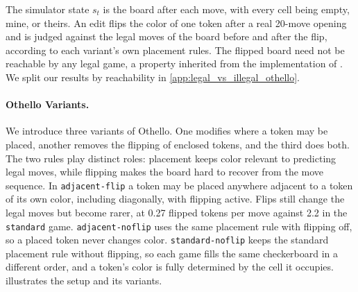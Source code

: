 \documentclass{article} %
\begin{document}
The simulator state $s_t$ is the board after each move, with every cell being empty, mine, or theirs. An edit flips the color of one token after a real 20-move opening and is judged against the legal moves of the board before and after the flip, according to each variant's own placement rules. The flipped board need not be reachable by any legal game, a property inherited from the implementation of \citet{li2023othello}. We split our results by reachability in \cref{app:legal_vs_illegal_othello}.


\paragraph{Othello Variants.}
We introduce three variants of Othello. One modifies where a token may be placed, another removes the flipping of enclosed tokens, and the third does both. The two rules play distinct roles: placement keeps color relevant to predicting legal moves, while flipping makes the board hard to recover from the move sequence. In \texttt{adjacent-flip} a token may be placed anywhere adjacent to a token of its own color, including diagonally, with flipping active. Flips still change the legal moves but become rarer, at 0.27 flipped tokens per move against 2.2 in the \texttt{standard} game. \texttt{adjacent-noflip} uses the same placement rule with flipping off, so a placed token never changes color. \texttt{standard-noflip} keeps the standard placement rule without flipping, so each game fills the same checkerboard in a different order, and a token's color is fully determined by the cell it occupies.  illustrates the setup and its variants.
\end{document}
